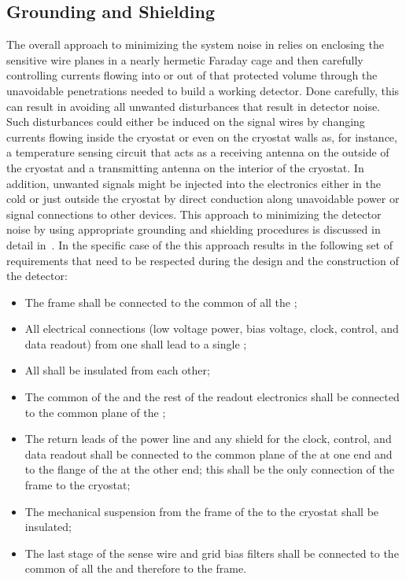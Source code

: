 \subsection{Grounding and Shielding}
\label{sec:fdsp-tpcelec-design-grounding}

The overall approach to minimizing the system noise in  
relies on enclosing the sensitive wire planes in a nearly hermetic 
Faraday cage and then carefully controlling currents flowing into or 
out of that protected volume through the unavoidable penetrations 
needed to build a working detector. Done carefully, this can result 
in avoiding all unwanted disturbances that result in detector noise. 
Such disturbances could either be induced on the signal wires by 
changing currents flowing inside the cryostat or even on the cryostat 
walls as, for instance, a temperature sensing circuit that acts as a 
receiving antenna on the outside of the cryostat and a transmitting 
antenna on the interior of the cryostat. In addition, unwanted signals 
might be injected into the electronics either in the cold or just 
outside the cryostat by direct conduction along unavoidable power 
or signal connections to other devices. This approach to minimizing
the detector noise by using appropriate grounding and shielding procedures
is discussed in detail in~\cite{radekaNoise}. In the specific case
of the   this approach results in the 
following set of requirements that need to be respected during the
design and the construction of the detector:
\begin{itemize}
\item{The  frame shall be connected to the common of
all the  ;}
\item{All electrical connections (low voltage power, bias voltage,
clock, control, and data readout) from one  shall lead to a 
single ;}
\item{All  shall be insulated from each other;}
\item{The common of the   and the rest of the 
 readout electronics shall be connected to
the common plane of the ;}
\item{The return leads of the  power line and any shield
for the clock, control, and data readout shall be connected
to the common plane of the  at one end and
to the flange of the  at the other end; this shall be 
the only connection of the  frame to the cryostat;}
\item{The mechanical suspension from the frame of the 
to the cryostat shall be insulated;}
\item{The last stage of the sense wire and grid bias filters shall be
connected to the common of all the   and therefore
to the  frame.}
\end{itemize}


